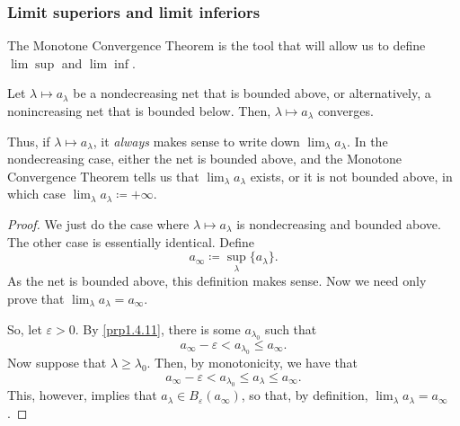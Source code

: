 \subsubsection{Limit superiors and limit inferiors}

The Monotone Convergence Theorem is the tool that will allow us to define $\lim \sup$ and $\lim \inf$.
\begin{prp}\label{MonotoneConvergenceTheorem}
Let $\lambda \mapsto a_\lambda$ be a nondecreasing net that is bounded above, or alternatively, a nonincreasing net that is bounded below.  Then, $\lambda \mapsto a_\lambda$ converges.
\begin{rmk}
Thus, if $\lambda \mapsto a_\lambda$, it \emph{always} makes sense to write down $\lim _\lambda a_\lambda$.  In the nondecreasing case, either the net is bounded above, and the Monotone Convergence Theorem tells us that $\lim _\lambda a_\lambda$ exists, or it is not bounded above, in which case $\lim _\lambda a_\lambda \coloneqq +\infty$.
\end{rmk}
\begin{proof}
We just do the case where $\lambda \mapsto a_\lambda$ is nondecreasing and bounded above.  The other case is essentially identical.  Define
\begin{equation}
a_\infty\coloneqq \sup _\lambda \{ a_\lambda \} .
\end{equation}
As the net is bounded above, this definition makes sense.  Now we need only prove that $\lim _\lambda a_\lambda =a_\infty$.

So, let $\varepsilon >0$.  By \cref{prp1.4.11}, there is some $a_{\lambda _0}$ such that
\begin{equation}
a_\infty-\varepsilon <a_{\lambda _0}\leq a_\infty.
\end{equation}
Now suppose that $\lambda \geq \lambda _0$.  Then, by monotonicity, we have that
\begin{equation}
a_\infty-\varepsilon <a_{\lambda _0}\leq a_\lambda \leq a_\infty.
\end{equation}
This, however, implies that $a_\lambda \in B_{\varepsilon}(a_\infty)$, so that, by definition, $\lim _\lambda a_\lambda =a_\infty$.
\end{proof}
\end{prp}
